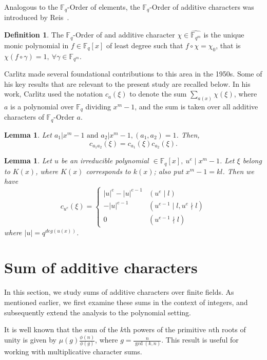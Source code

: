 \documentclass[12pt,a4paper]{article}
\theoremstyle{plain}
\newtheorem{lem}[thm]{Lemma}
\theoremstyle{definition}
\newtheorem{defn}{Definition}[section]
\numberwithin{equation}{section}
\begin{document}
    Analogous to the $\mathbb{F}_q$-Order of elements, the $\mathbb{F}_q$-Order of additive characters was introduced by Reis~\cite{Reis2020additive}. 
    \begin{defn}\cite{Reis2020additive}
        The $\mathbb{F}_q$-Order of and additive character $\chi \in \displaystyle \widehat{\mathbb{F}_{q^m}}$ is the unique monic polynomial in $f \in \mathbb{F}_q[x]$ of least degree such that $f \circ \chi = \chi_0$, that is $\chi(f\circ \gamma ) = 1, ~\forall \gamma \in \mathbb{F}_{q^m}$. 
    \end{defn}

    Carlitz made several foundational contributions to this area in the 1950s. Some of his key results that are relevant to the present study are recalled below. In his work, Carlitz used the notation $c_a(\xi)$ to denote the sum $\sum_{a(x)} \chi(\xi)$, where $a$ is a polynomial over $\mathbb{F}_q$ dividing $x^m - 1$, and the sum is taken over all additive characters of $\mathbb{F}_q$-Order $a$.

    \begin{lem}\cite{Carlitz1954Sum}\label{CarlitzLemrelativelyprimepol}
        Let $a_1\left|x^m-1 \text{ and } a_2\right| x^m-1,\left(a_1, a_2\right)=1$. Then, $$c_{a_1 a_2}(\xi)=c_{a_1}(\xi) c_{a_2}(\xi).$$ 
        \end{lem}
    \begin{lem} \cite{Carlitz1954Sum}\label{CarlitzLemmairpol}
        Let $u$ be an irreducible polynomial $\in \mathbb{F}_q[x], ~u^e \mid x^m-1$. Let $\xi$ belong to $K(x)$, where $K(x)$ corresponds to $k(x)$; also put $x^m-1=k l$. Then we have $$c_{u^e}(\xi)= \begin{cases}|u|^e-|u|^{e-1} & \left(u^e \mid l\right) \\ -|u|^{e-1} & \left(u^{e-1} \mid l, u^e\nmid l\right) \\ 0 & \left(u^{e-1}\nmid l\right)\end{cases}$$
        where $|u| = q^{deg(u(x))}$.
    \end{lem}
    \section{Sum of additive characters}
    In this section, we study sums of additive characters over finite fields. As mentioned earlier, we first examine these sums in the context of integers, and subsequently extend the analysis to the polynomial setting.

    It is well known that the sum of the $k$th powers of the primitive $n$th roots of unity is given by $\mu(g) \frac{\phi(n)}{\phi(g)}$, where $g = \frac{n}{\gcd(k, n)}$. This result is useful for working with multiplicative character sums.
\end{document}
